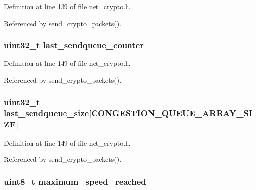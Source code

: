 Definition at line 139 of file net\+\_\+crypto.\+h.



Referenced by send\+\_\+crypto\+\_\+packets().

\hypertarget{struct_crypto___connection_a9fff7889476ca9104b603dd03781e0c9}{
\subsubsection[{last\+\_\+sendqueue\+\_\+counter}]{\setlength{\rightskip}{0pt plus 5cm}uint32\+\_\+t last\+\_\+sendqueue\+\_\+counter}}\label{struct_crypto___connection_a9fff7889476ca9104b603dd03781e0c9}


Definition at line 149 of file net\+\_\+crypto.\+h.



Referenced by send\+\_\+crypto\+\_\+packets().

\hypertarget{struct_crypto___connection_a0157f7d2fcd3f9d92521930547ddaae6}{
\subsubsection[{last\+\_\+sendqueue\+\_\+size}]{\setlength{\rightskip}{0pt plus 5cm}uint32\+\_\+t last\+\_\+sendqueue\+\_\+size\mbox{[}{\bf C\+O\+N\+G\+E\+S\+T\+I\+O\+N\+\_\+\+Q\+U\+E\+U\+E\+\_\+\+A\+R\+R\+A\+Y\+\_\+\+S\+I\+Z\+E}\mbox{]}}}\label{struct_crypto___connection_a0157f7d2fcd3f9d92521930547ddaae6}


Definition at line 149 of file net\+\_\+crypto.\+h.



Referenced by send\+\_\+crypto\+\_\+packets().

\hypertarget{struct_crypto___connection_a8aa9d51e0fa27ad34f8046486d519275}{
\subsubsection[{maximum\+\_\+speed\+\_\+reached}]{\setlength{\rightskip}{0pt plus 5cm}uint8\+\_\+t maximum\+\_\+speed\+\_\+reached}}\label{struct_crypto___connection_a8aa9d51e0fa27ad34f8046486d519275}


